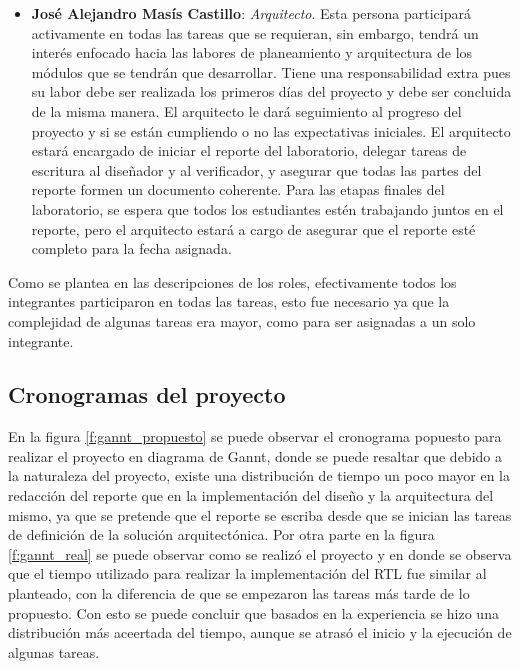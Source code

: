 \begin{itemize}
\item \textbf{Jos\'e Alejandro Mas\'is Castillo}: \textit{Arquitecto}. Esta persona participar\' a activamente en todas las tareas que se requieran, sin embargo, tendr\' a un inter\' es enfocado hacia las labores de planeamiento y arquitectura de los m\' odulos que se tendr\' an que desarrollar. Tiene una responsabilidad extra pues su labor debe ser realizada los primeros d\'ias del proyecto y debe ser concluida de la misma manera. El arquitecto le dar\'a seguimiento al progreso del proyecto y si se est\'an cumpliendo o no las expectativas iniciales. El arquitecto estar\'a encargado de iniciar el reporte del laboratorio, delegar tareas de escritura al dise\~nador y al verificador, y asegurar que todas las partes del reporte formen un documento coherente. Para las etapas finales del laboratorio, se espera que todos los estudiantes est\'en trabajando juntos en el reporte, pero el arquitecto estar\'a a cargo de asegurar que el reporte est\'e completo para la fecha asignada.
\end{itemize}

Como se plantea en las descripciones de los roles, efectivamente todos los integrantes participaron en todas las tareas, esto fue necesario ya que la complejidad de algunas tareas era mayor, como para ser asignadas a un solo integrante.\\

\subsection{Cronogramas del proyecto}

En la figura \ref{f:gannt_propuesto} se puede observar el cronograma popuesto para realizar el proyecto en diagrama de Gannt, donde se puede resaltar que debido a la naturaleza del proyecto, existe una distribuci\'on de tiempo un poco mayor en la redacci\'on del reporte que en la implementaci\'on del dise\~no y la arquitectura del mismo, ya que se pretende que el reporte se escriba desde que se inician las tareas de definici\'on de la soluci\'on arquitect\'onica. Por otra parte en la figura \ref{f:gannt_real} se puede observar como se realiz\' o el proyecto y en donde se observa que el tiempo utilizado para realizar la implementaci\'on del RTL fue similar al planteado, con la diferencia de que se empezaron las tareas m\'as tarde de lo propuesto. Con esto se  puede concluir que basados en la experiencia se hizo una distribuci\'on m\'as aceertada del tiempo, aunque se atras\'o el inicio y la ejecuci\'on de algunas tareas.\\

